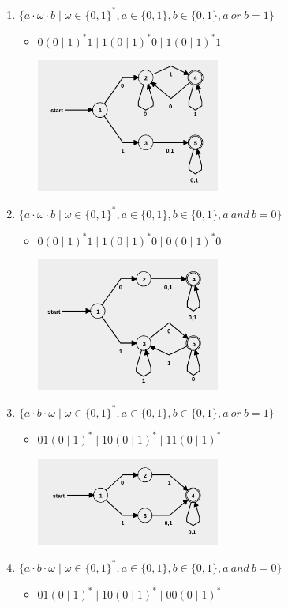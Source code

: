 \documentclass[12pt]{article}
\begin{document}
\begin{enumerate}
\begin{enumerate}[label=\arabic*)]
    \item $\{ a \cdot \omega \cdot b \mid \omega \in \{0, 1\}^*, a \in \{0, 1\}, b \in \{0, 1\}, a \ or \ b = 1 \}$
    \begin{itemize}
      \item $ 0 (0 \mid 1)^* 1 \mid 1 (0 \mid 1)^* 0 \mid 1 (0 \mid 1)^* 1$

      \includegraphics[width=0.5\textwidth]{2.3.png}
    \end{itemize}

    \item $\{ a \cdot \omega \cdot b \mid \omega \in \{0, 1\}^*, a \in \{0, 1\}, b \in \{0, 1\}, a \ and \ b = 0 \}$
    \begin{itemize}
      \item $0 (0 \mid 1)^* 1 \mid 1 (0 \mid 1)^* 0 \mid 0 (0 \mid 1)^* 0 $

      \includegraphics[width=0.5\textwidth]{2.4.png}
    \end{itemize}
    \item $\{ a \cdot b \cdot \omega \mid \omega \in \{0, 1\}^*, a \in \{0, 1\}, b \in \{0, 1\}, a \ or \ b = 1 \}$
    \begin{itemize}
      \item $0 1 (0 \mid 1)^* \mid 1 0 (0 \mid 1)^* \mid 1 1 (0 \mid 1)^* $

      \includegraphics[width=0.5\textwidth]{2.5.png}
    \end{itemize}
    \item $\{ a \cdot b \cdot \omega \mid \omega \in \{0, 1\}^*, a \in \{0, 1\}, b \in \{0, 1\}, a \ and \ b = 0 \}$
    \begin{itemize}
      \item $  0 1 (0 \mid 1)^* \mid 1 0  (0 \mid 1)^* \mid 0 0 (0 \mid 1)^* $


\end{itemize}
\end{enumerate}
\end{enumerate}
\end{document}
